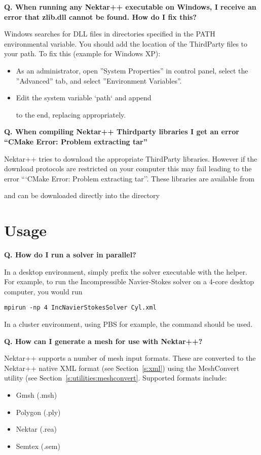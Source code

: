 \textbf{Q. When running any Nektar++ executable on Windows, I receive an error
that zlib.dll cannot be found. How do I fix this?}

Windows searches for DLL files in directories specified in the PATH
environmental variable. You should add the location of the ThirdParty files to
your path. To fix this (example for Windows XP):
\begin{itemize}
\item As an administrator, open ''System Properties'' in control panel, select
the ''Advanced'' tab, and select ''Environment Variables''.
\item Edit the system variable `path` and append


to the end, replacing
 appropriately.
\end{itemize}


\textbf{Q. When compiling Nektar++ Thirdparty libraries I get an error ``CMake Error: Problem extracting tar''}

Nektar++ tries to download the appropriate ThirdParty
libraries. However if the download protocols are restricted on your
computer this may fail leading to the error ```CMake Error: Problem
extracting tar''. These libraries are available from

\hspace{1cm} 

 and can be downloaded directly into the
 directory

\section{Usage}
\textbf{Q. How do I run a solver in parallel?}

In a desktop environment, simply prefix the solver executable with the
 helper. For example, to run the Incompressible Navier-Stokes
solver on a 4-core desktop computer, you would run
\begin{lstlisting}[style=BashInputStyle]
mpirun -np 4 IncNavierStokesSolver Cyl.xml
\end{lstlisting}
In a cluster environment, using PBS for example, the  command
should be used.


\textbf{Q. How can I generate a mesh for use with Nektar++?}

Nektar++ supports a number of mesh input formats. These are converted to the
Nektar++ native XML format (see Section~\ref{s:xml}) using the
MeshConvert utility (see Section~\ref{s:utilities:meshconvert}. Supported
formats include:
\begin{itemize}
\item Gmsh (.msh) 
\item Polygon (.ply)
\item Nektar (.rea) 
\item Semtex (.sem)
\end{itemize}
